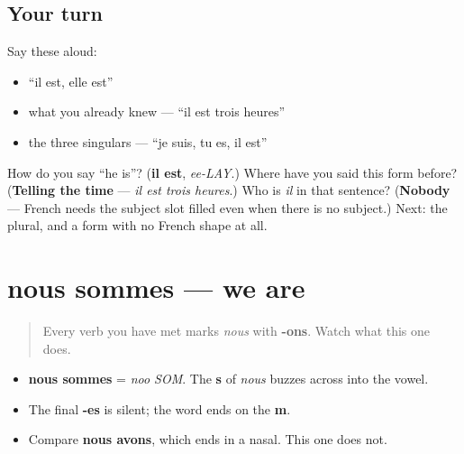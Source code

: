 \subsection*{Your turn}
Say these aloud:

\begin{itemize}
\raggedright
  \item \textquotedblleft{}il est, elle est\textquotedblright{}
  \item what you already knew — \textquotedblleft{}il est trois heures\textquotedblright{}
  \item the three singulars — \textquotedblleft{}je suis, tu es, il est\textquotedblright{}
\end{itemize}

\begin{tcolorbox}[breakable,colback=teal!4,colframe=teal!35!black,title={Before you move on}]
How do you say \textquotedblleft{}he is\textquotedblright{}? (\textbf{il est}, \emph{ee-LAY}.) Where have you said this form before? (\textbf{Telling the time} — \emph{il est trois heures}.) Who is \emph{il} in that sentence? (\textbf{Nobody} — French needs the subject slot filled even when there is no subject.) Next: the plural, and a form with no French shape at all.
\end{tcolorbox}
\section[nous sommes]{nous sommes — we are}

\label{lesson:FR-C16-sommes}



\begin{quote}
Every verb you have met marks \emph{nous} with \textbf{-ons}. Watch what this one does.
\end{quote}

\begin{sounds}
\begin{itemize}
\raggedright
  \item \textbf{nous sommes} = \emph{noo SOM}. The \textbf{s} of \emph{nous} buzzes across into the vowel.
  \item The final \textbf{-es} is silent; the word ends on the \textbf{m}.
  \item Compare \textbf{nous avons}, which ends in a nasal. This one does not.
\end{itemize}
\end{sounds}

